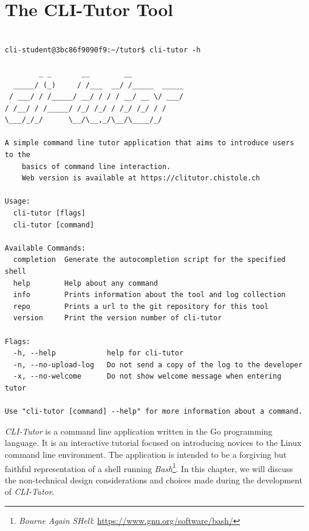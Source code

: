 \chapter{The CLI-Tutor Tool}
%
\label{chap:clitutor}

\begin{lstlisting}[float=htbp, keepspaces, frame=single, language={}, label=lst:clihelp, caption=Output of the help flag of \textit{CLI-Tutor} running in a docker container.]

cli-student@3bc86f9090f9:~/tutor$ cli-tutor -h

        _ _       __        __
  _____/ (_)     / /___  __/ /_____  _____
 / ___/ / /_____/ __/ / / / __/ __ \/ ___/
/ /__/ / /_____/ /_/ /_/ / /_/ /_/ / /
\___/_/_/      \__/\__,_/\__/\____/_/

A simple command line tutor application that aims to introduce users to the
    basics of command line interaction.
    Web version is available at https://clitutor.chistole.ch

Usage:
  cli-tutor [flags]
  cli-tutor [command]

Available Commands:
  completion  Generate the autocompletion script for the specified shell
  help        Help about any command
  info        Prints information about the tool and log collection
  repo        Prints a url to the git repository for this tool
  version     Print the version number of cli-tutor

Flags:
  -h, --help            help for cli-tutor
  -n, --no-upload-log   Do not send a copy of the log to the developer
  -x, --no-welcome      Do not show welcome message when entering tutor

Use "cli-tutor [command] --help" for more information about a command.
\end{lstlisting}


\textit{CLI-Tutor} is a command line application written in the Go
programming language. It is an interactive tutorial focused on introducing
novices to the Linux command line environment. The application is intended to
be a forgiving but faithful representation of a shell running
\textit{Bash}\footnote{\textit{Bourne Again SHell}:
\url{https://www.gnu.org/software/bash/}}. In this chapter, we will discuss the non-technical design considerations and choices made during the development of \textit{CLI-Tutor}.

